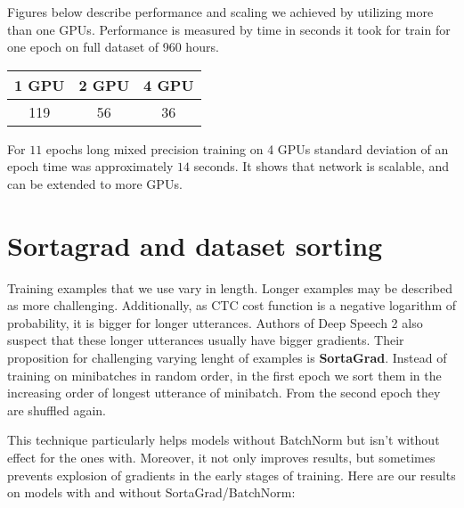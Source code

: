 \documentclass[licencjacka,en]{pracamgr}
\newcommand{\todoplot}[1]{
\ \\
\noindent%
\begin{minipage}{\linewidth}%
\makebox[\linewidth]{%
		\begin{tikzpicture}
		\begin{axis}[
            ymin = 0, ymax = 5,
            xmin = 0, xmax = 600,
            minor y tick num = 4,
            minor x tick num = 1,
            ymajorgrids = true,
            grid style = dashed,
            scaled x ticks = false,
            xlabel = TODO,
            ylabel = TODO,
            legend pos=outer north east,
            no markers
          ]
		  \addplot table[x=epochs,y=training]{\first};
		  \addlegendentry{TODO}

		\end{axis}
		\end{tikzpicture}
		}\captionof{figure}{#1}\label{diag:time}     
\end{minipage}
}
\begin{document}
Figures below describe performance and scaling we achieved by utilizing more than one GPUs. Performance is measured by time in seconds it took for train for one epoch on full dataset of 960 hours.

{
\centering
\begin{tabular}{|c|c|c|}
        \hline
        1 GPU & 2 GPU & 4 GPU \\
        \hline
        \hline
        119 & 56 & 36 \\
        \hline
    \end{tabular}
}

For $11$ epochs long mixed precision training on 4 GPUs standard deviation of an epoch time was approximately $14$ seconds. It shows that network is scalable, and can be extended to more GPUs.


\section{Sortagrad and dataset sorting}
Training examples that we use vary in length. Longer examples may be described as more challenging. Additionally, as CTC cost function is a negative logarithm of probability, it is bigger for longer utterances. Authors of Deep Speech 2 also suspect that these longer utterances usually have bigger gradients. Their proposition for challenging varying lenght of examples is \textbf{SortaGrad}. Instead of training on minibatches in random order, in the first epoch we sort them in the increasing order of longest utterance of minibatch. From the second epoch they are shuffled again.

This technique particularly helps models without BatchNorm but isn't without effect for the ones with. Moreover, it not only improves results, but sometimes prevents explosion of gradients in the early stages of training. Here are our results on models with and without SortaGrad/BatchNorm:

\todoplot{TODO}
\end{document}
